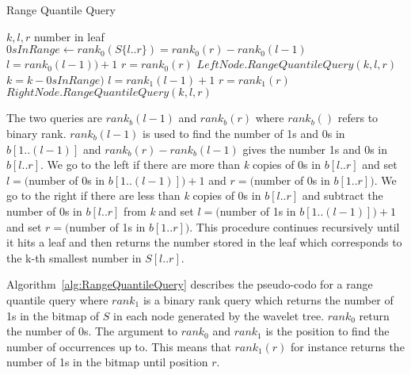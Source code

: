 \begin{algorithm}
\caption{Range Quantile Query}
\label{alg:RangeQuantileQuery}
\begin{algorithmic}
 {$k,l,r$}
	\State \Return number in leaf
\EndIf
\State $\textit{0}sInRange \gets rank_0(S \lbrace l..r \rbrace) = rank_0(r) - rank_0(l-1)$
	\State $l = rank_0(l-1))+1$
	\State $r = rank_0(r)$
	\State \Return $LeftNode.RangeQuantileQuery(k,l,r)$
\Else
	\State $k = k - \textit{0}sInRange)$
	\State $l = rank_1(l-1)+1$
	\State $r = rank_1(r)$
	\State \Return $RightNode.RangeQuantileQuery(k,l,r)$
\EndIf

\EndFunction
\end{algorithmic}
\end{algorithm}

The two queries are $rank_b(l-1)$ and $rank_b(r)$ where $rank_b()$ refers to binary rank.
$rank_b(l-1)$ is used to find the number of 1s and 0s in $b[1..(l-1)]$ and $rank_b(r) - rank_b(l-1)$ gives the number 1s and 0s in $b[l..r]$. 
We go to the left if there are more than \textit{k} copies of 0s in $b[l..r]$ and set $l = ($number of 0s in $b[1..(l-1)])+1$ and $r=($number of 0s in $b[1..r])$. 
We go to the right if there are less than \textit{k} copies of 0s in $b[l..r]$ and subtract the number of 0s in $b[l..r]$ from \textit{k} and set $l = ($number of 1s in $b[1..(l-1)])+1$ and set $r=($number of 1s in $b[1..r])$. 
This procedure continues recursively until it hits a leaf and then returns the number stored in the leaf which corresponds to the k-th smallest number in $S[l..r]$.

Algorithm~\ref{alg:RangeQuantileQuery} describes the pseudo-codo for a range quantile query where $rank_1$ is a binary rank query which returns the number of 1s in the bitmap of $S$ in each node generated by the wavelet tree. 
$rank_0$ return the number of 0s.
The argument to $rank_0$ and $rank_1$ is the position to find the number of occurrences up to.
This means that $rank_1(r)$ for instance returns the number of 1s in the bitmap until position $r$.

